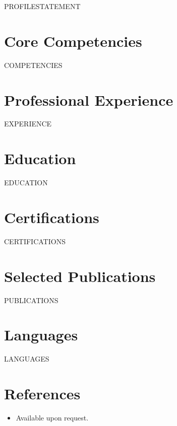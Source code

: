 \documentclass[11pt,a4paper,sans]{moderncv}
\begin{document}
\makecvtitle

\vspace{6pt}
\small{PROFILESTATEMENT}

\section{Core Competencies}
\vspace{1pt}
\begin{itemize}
COMPETENCIES
\end{itemize}

\section{Professional Experience}
\vspace{3pt}
\begin{itemize}
EXPERIENCE
\end{itemize}

\section{Education}
\vspace{1pt}
\begin{itemize}
EDUCATION
\end{itemize}

\section{Certifications}
\vspace{1pt}
\begin{itemize}
CERTIFICATIONS
\end{itemize}

\section{Selected Publications}
\vspace{1pt}
\begin{itemize}
PUBLICATIONS
\end{itemize}

\section{Languages}
\vspace{1pt}
\begin{itemize}
LANGUAGES
\end{itemize}

\section{References}
\vspace{1pt}
\begin{itemize}
\item{Available upon request.}
\end{itemize}
\end{document}
